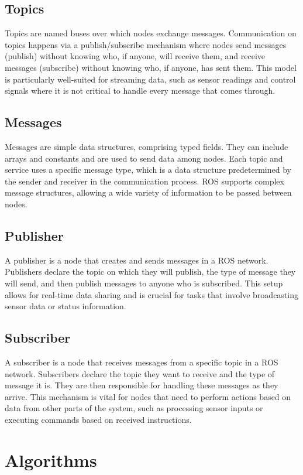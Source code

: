 \documentclass{article}
\begin{document}
	\subsection{Topics}
	Topics are named buses over which nodes exchange messages. Communication on topics happens via a publish/subscribe mechanism where nodes send messages (publish) without knowing who, if anyone, will receive them, and receive messages (subscribe) without knowing who, if anyone, has sent them. This model is particularly well-suited for streaming data, such as sensor readings and control signals where it is not critical to handle every message that comes through.
	
	\subsection{Messages}
	Messages are simple data structures, comprising typed fields. They can include arrays and constants and are used to send data among nodes. Each topic and service uses a specific message type, which is a data structure predetermined by the sender and receiver in the communication process. ROS supports complex message structures, allowing a wide variety of information to be passed between nodes.
	
	\subsection{Publisher}
	A publisher is a node that creates and sends messages in a ROS network. Publishers declare the topic on which they will publish, the type of message they will send, and then publish messages to anyone who is subscribed. This setup allows for real-time data sharing and is crucial for tasks that involve broadcasting sensor data or status information.
	
	\subsection{Subscriber}
	A subscriber is a node that receives messages from a specific topic in a ROS network. Subscribers declare the topic they want to receive and the type of message it is. They are then responsible for handling these messages as they arrive. This mechanism is vital for nodes that need to perform actions based on data from other parts of the system, such as processing sensor inputs or executing commands based on received instructions.
	
	\section{Algorithms}
\end{document}
